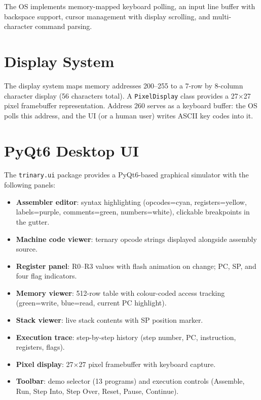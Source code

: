 \documentclass[11pt,a4paper]{article}
\begin{document}
The OS implements memory-mapped keyboard polling, an input line buffer with
backspace support, cursor management with display scrolling, and
multi-character command parsing.

\section{Display System}
\label{sec:display}

The display system maps memory addresses 200--255 to a 7-row by 8-column
character display (56 characters total).  A \texttt{PixelDisplay} class
provides a 27$\times$27 pixel framebuffer representation.  Address 260 serves
as a keyboard buffer: the OS polls this address, and the UI (or a human user)
writes ASCII key codes into it.

\section{PyQt6 Desktop UI}
\label{sec:ui}

The \texttt{trinary.ui} package provides a PyQt6-based graphical simulator
with the following panels:

\begin{itemize}
  \item \textbf{Assembler editor}: syntax highlighting (opcodes=cyan,
        registers=yellow, labels=purple, comments=green, numbers=white),
        clickable breakpoints in the gutter.
  \item \textbf{Machine code viewer}: ternary opcode strings displayed
        alongside assembly source.
  \item \textbf{Register panel}: R0--R3 values with flash animation on change;
        PC, SP, and four flag indicators.
  \item \textbf{Memory viewer}: 512-row table with colour-coded access tracking
        (green=write, blue=read, current PC highlight).
  \item \textbf{Stack viewer}: live stack contents with SP position marker.
  \item \textbf{Execution trace}: step-by-step history (step number, PC,
        instruction, registers, flags).
  \item \textbf{Pixel display}: 27$\times$27 pixel framebuffer with keyboard
        capture.
  \item \textbf{Toolbar}: demo selector (13 programs) and execution controls
        (Assemble, Run, Step Into, Step Over, Reset, Pause, Continue).
\end{itemize}
\end{document}
